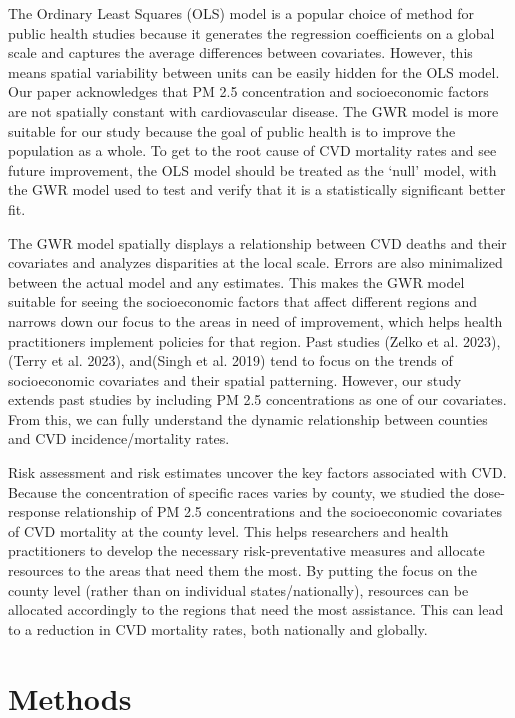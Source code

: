 \documentclass[
]{article}
\begin{document}
The Ordinary Least Squares (OLS) model is a popular choice of method for
public health studies because it generates the regression coefficients
on a global scale and captures the average differences between
covariates. However, this means spatial variability between units can be
easily hidden for the OLS model. Our paper acknowledges that PM 2.5
concentration and socioeconomic factors are not spatially constant with
cardiovascular disease. The GWR model is more suitable for our study
because the goal of public health is to improve the population as a
whole. To get to the root cause of CVD mortality rates and see future
improvement, the OLS model should be treated as the `null' model, with
the GWR model used to test and verify that it is a statistically
significant better fit.

The GWR model spatially displays a relationship between CVD deaths and
their covariates and analyzes disparities at the local scale. Errors are
also minimalized between the actual model and any estimates. This makes
the GWR model suitable for seeing the socioeconomic factors that affect
different regions and narrows down our focus to the areas in need of
improvement, which helps health practitioners implement policies for
that region. Past studies (Zelko et al. 2023),(Terry et al. 2023),
and(Singh et al. 2019) tend to focus on the trends of socioeconomic
covariates and their spatial patterning. However, our study extends past
studies by including PM 2.5 concentrations as one of our covariates.
From this, we can fully understand the dynamic relationship between
counties and CVD incidence/mortality rates.~

Risk assessment and risk estimates uncover the key factors associated
with CVD. Because the concentration of specific races varies by county,
we studied the dose-response relationship of PM 2.5 concentrations and
the socioeconomic covariates of CVD mortality at the county level. This
helps researchers and health practitioners to develop the necessary
risk-preventative measures and allocate resources to the areas that need
them the most. By putting the focus on the county level (rather than on
individual states/nationally), resources can be allocated accordingly to
the regions that need the most assistance. This can lead to a reduction
in CVD mortality rates, both nationally and globally.

\section{Methods}\label{methods}
\end{document}
